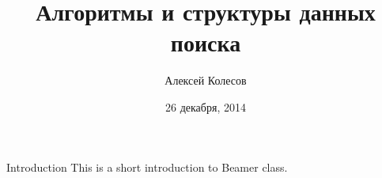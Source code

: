 \documentclass{beamer}
\title[Алгоритмы и структуры данных поиска]{Алгоритмы и структуры данных поиска}
\author{Алексей Колесов}
\institute{ШАД 2015. Минск}
\date{26 декабря, 2014}
\begin{document}
\begin{frame}
\titlepage
\end{frame}


\begin{frame}{Introduction}
This is a short introduction to Beamer class.
\end{frame}
\end{document}
